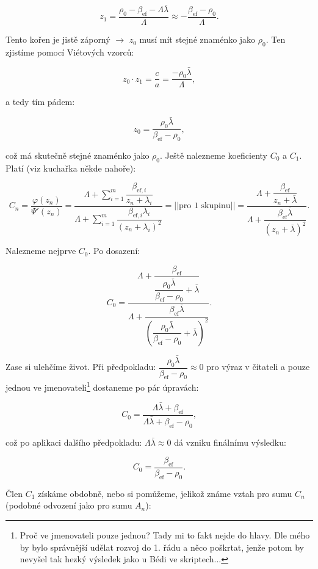$$ z_1 = \dfrac{\rho_0 - \beta_{\text{ef}} - \Lambda \bar{\lambda}}{\Lambda} \approx -\dfrac{\beta_{\text{ef}} - \rho_0}{\Lambda}. $$

 Tento kořen je jistě záporný $\rightarrow$ $z_0$ musí mít stejné znaménko jako $\rho_0$. Ten zjistíme pomocí Viétových vzorců:

$$ z_0 \cdot z_1 = \dfrac{c}{a} = \dfrac{-\rho_0 \bar{\lambda}}{\Lambda}, $$

a tedy tím pádem:

$$ z_0 = \dfrac{\rho_0 \bar{\lambda}}{\beta_{\text{ef}} - \rho_0}, $$

což má skutečně stejné znaménko jako $\rho_0$. Ještě nalezneme koeficienty $C_0$ a $C_1$. Platí (viz kuchařka někde nahoře):

$$ C_n = \dfrac{\varphi(z_n)}{\Psi'(z_n)} = \dfrac{\Lambda + \sum_{i = 1}^m \dfrac{\beta_{\text{ef},i}}{z_n + \lambda_i}}{\Lambda  + \sum_{i = 1}^m \dfrac{\beta_{\text{ef},i} \lambda_i}{(z_n + \lambda_i)^2}} = ||\text{pro 1 skupinu}|| =  \dfrac{\Lambda + \dfrac{\beta_{\text{ef}}}{z_n + \bar{\lambda}}}{\Lambda  + \dfrac{\beta_{\text{ef}} \bar{\lambda}}{(z_n + \bar{\lambda})^2}}. $$

Nalezneme nejprve $C_0$. Po dosazení:

$$ C_0 = \dfrac{\Lambda + \dfrac{\beta_{\text{ef}}}{\dfrac{\rho_0 \bar{\lambda}}{\beta_{\text{ef}} - \rho_0} + \bar{\lambda}}}{\Lambda  + \dfrac{\beta_{\text{ef}} \bar{\lambda}}{ \left ( \dfrac{\rho_0 \bar{\lambda}}{\beta_{\text{ef}} - \rho_0} + \bar{\lambda} \right ) ^2}}. $$

Zase si ulehčíme život. Při předpokladu: $\dfrac{\rho_0 \bar{\lambda}}{\beta_{\text{ef}} - \rho_0} \approx 0$ pro výraz v čitateli a pouze jednou ve jmenovateli\footnote{Proč ve jmenovateli pouze jednou? Tady mi to fakt nejde do hlavy. Dle mého by bylo správnější udělat rozvoj do 1. řádu a něco poškrtat, jenže potom by nevyšel tak hezký výsledek jako u Bédi ve skriptech...} dostaneme po pár úpravách:

$$ C_0 = \dfrac{\Lambda \bar{\lambda} + \beta_{\text{ef}}}{\Lambda \bar{\lambda} + \beta_{\text{ef}} - \rho_0}, $$

což po aplikaci dalšího předpokladu: $\Lambda \bar{\lambda} \approx 0$ dá vzniku finálnímu výsledku:

$$ C_0 = \dfrac{\beta_{\text{ef}}}{\beta_{\text{ef}} - \rho_0}. $$

Člen $C_1$ získáme obdobně, nebo si pomůžeme, jelikož známe vztah pro sumu $C_n$ (podobné odvození jako pro sumu $A_n$):


